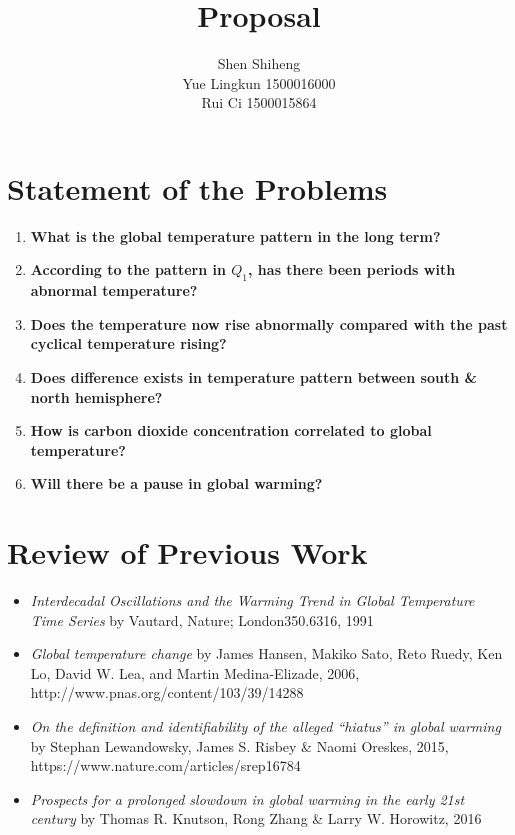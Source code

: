 \documentclass[10pt,a4paper]{article}
\author{Shen Shiheng \quad 1500015941 \\ Yue Lingkun \quad \hspace{0.2mm} 1500016000\\ Rui Ci \quad \hspace{11.2mm} 1500015864}
\title{\textbf{Proposal}}
\begin{document}
\maketitle

\section{Statement of the Problems}
\begin{enumerate}
	\item \textbf{What is the global temperature pattern in the long term?}
	\item \textbf{According to the pattern in $Q_1$, has there been periods with abnormal temperature?}
	\item \textbf{Does the temperature now rise abnormally compared with the past cyclical temperature rising?}  
	\item \textbf{Does difference exists in temperature pattern between south \& north hemisphere?}
	\item \textbf{How is carbon dioxide concentration correlated to global temperature?} 
	\item \textbf{Will there be a pause in global warming?} 
\end{enumerate}

\section{Review of Previous Work}
\begin{itemize}
	\item \textit{Interdecadal Oscillations and the Warming Trend in Global Temperature Time Series} by Vautard, Nature; London350.6316, 1991 
	\item \textit{Global temperature change} by James Hansen, Makiko Sato, Reto Ruedy, Ken Lo, David W. Lea, and Martin Medina-Elizade, 2006, http://www.pnas.org/content/103/39/14288
	\item \textit{On the definition and identifiability of the alleged “hiatus” in global warming} by Stephan Lewandowsky, James S. Risbey \& Naomi Oreskes, 2015, https://www.nature.com/articles/srep16784 
	\item \textit{Prospects for a prolonged slowdown in global warming in the early 21st century} by Thomas R. Knutson, Rong Zhang \& Larry W. Horowitz, 2016
\end{itemize}
\end{document}
